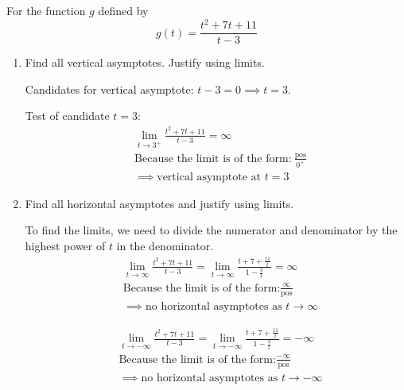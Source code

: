 \documentclass[nooutcomes,handout]{ximera}
\begin{document}
\begin{problem}

  For the function $g$ defined by 
  \[
    g(t) = \frac{t^2 + 7t + 11}{t-3}
  \]
  \begin{enumerate}
    \item
      Find all vertical asymptotes.  Justify using limits.
      \begin{freeResponse}
        Candidates for vertical asymptote: $t - 3 = 0 \implies t = 3$.

        Test of candidate $t = 3$:
        \begin{align*}
          &\lim_{t \to 3^+} \frac{t^2 + 7t + 11}{t-3}= \infty \\
	&\text{Because the limit is of the form:}\ \frac{\text{pos}}{0^+}\\
          &\implies \mbox{vertical asymptote at $t = 3$}
        \end{align*}


      \end{freeResponse}


    \item

      Find all horizontal asymptotes and justify using limits.
      \begin{freeResponse}
	To find the limits, we need to divide the numerator and denominator by the highest power of $t$ in the denominator.
        \begin{align*} 
         &\lim_{t \to \infty} \frac{t^2 + 7t + 11}{t-3} = \lim_{t \to \infty} \frac{t + 7 + \frac{11}{t}}{1-\frac{3}{t}} = \infty \\
	&\text{Because the limit is of the form:} \frac{\infty}{\text{pos}}\\
          &\implies \mbox{no horizontal asymptotes as $t \to \infty$}
        \end{align*}

        \begin{align*}
         & \lim_{t \to -\infty} \frac{t^2 + 7t + 11}{t-3} = \lim_{t \to -\infty}\frac{t + 7 + \frac{11}{t}}{1-\frac{3}{t}} = -\infty \\
	&\text{Because the limit is of the form:} \frac{-\infty}{\text{pos}}\\
          &\implies \mbox{no horizontal asymptotes as $t \to -\infty$}
        \end{align*}
      \end{freeResponse}



  \end{enumerate}
\end{problem}
\end{document}
